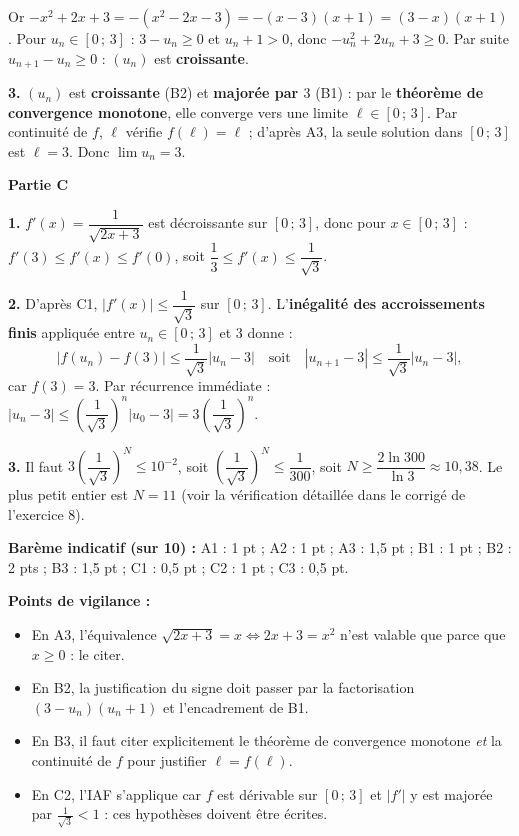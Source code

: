 \documentclass[11pt]{article}
\begin{document}
\begin{corrige}
Or $-x^2 + 2x + 3 = -(x^2 - 2x - 3) = -(x-3)(x+1) = (3-x)(x+1)$. Pour $u_n \in [0\,;\,3]$ : $3 - u_n \geq 0$ et $u_n + 1 > 0$, donc $-u_n^2 + 2u_n + 3 \geq 0$. Par suite $u_{n+1} - u_n \geq 0$ : $(u_n)$ est \textbf{croissante}.

\textbf{3.} $(u_n)$ est \textbf{croissante} (B2) et \textbf{majorée par $3$} (B1) : par le \textbf{théorème de convergence monotone}, elle converge vers une limite $\ell \in [0\,;\,3]$. Par continuité de $f$, $\ell$ vérifie $f(\ell) = \ell$ ; d'après A3, la seule solution dans $[0\,;\,3]$ est $\ell = 3$. Donc $\lim u_n = 3$.

\textbf{Partie C}

\textbf{1.} $f'(x) = \dfrac{1}{\sqrt{2x+3}}$ est décroissante sur $[0\,;\,3]$, donc pour $x \in [0\,;\,3]$ : $f'(3) \leq f'(x) \leq f'(0)$, soit $\dfrac{1}{3} \leq f'(x) \leq \dfrac{1}{\sqrt{3}}$.

\textbf{2.} D'après C1, $|f'(x)| \leq \dfrac{1}{\sqrt{3}}$ sur $[0\,;\,3]$. L'\textbf{inégalité des accroissements finis} appliquée entre $u_n \in [0\,;\,3]$ et $3$ donne :
\[ |f(u_n) - f(3)| \leq \frac{1}{\sqrt{3}}|u_n - 3| \quad\text{soit}\quad |u_{n+1} - 3| \leq \frac{1}{\sqrt{3}}|u_n - 3|, \]
car $f(3) = 3$. Par récurrence immédiate : $|u_n - 3| \leq \left(\dfrac{1}{\sqrt{3}}\right)^n |u_0 - 3| = 3\left(\dfrac{1}{\sqrt{3}}\right)^n$.

\textbf{3.} Il faut $3\left(\dfrac{1}{\sqrt{3}}\right)^N \leq 10^{-2}$, soit $\left(\dfrac{1}{\sqrt{3}}\right)^N \leq \dfrac{1}{300}$, soit $N \geq \dfrac{2\ln 300}{\ln 3} \approx 10{,}38$. Le plus petit entier est $\boxed{N = 11}$ (voir la vérification détaillée dans le corrigé de l'exercice 8).

\textbf{Barème indicatif (sur 10) :} A1 : 1 pt ; A2 : 1 pt ; A3 : 1,5 pt ; B1 : 1 pt ; B2 : 2 pts ; B3 : 1,5 pt ; C1 : 0,5 pt ; C2 : 1 pt ; C3 : 0,5 pt.

\textbf{Points de vigilance :}
\begin{itemize}
\item En A3, l'équivalence $\sqrt{2x+3} = x \iff 2x+3 = x^2$ n'est valable que parce que $x \geq 0$ : le citer.
\item En B2, la justification du signe doit passer par la factorisation $(3 - u_n)(u_n + 1)$ et l'encadrement de B1.
\item En B3, il faut citer explicitement le théorème de convergence monotone \emph{et} la continuité de $f$ pour justifier $\ell = f(\ell)$.
\item En C2, l'IAF s'applique car $f$ est dérivable sur $[0\,;\,3]$ et $|f'|$ y est majorée par $\frac{1}{\sqrt{3}} < 1$ : ces hypothèses doivent être écrites.
\end{itemize}
\end{corrige}
\end{document}

